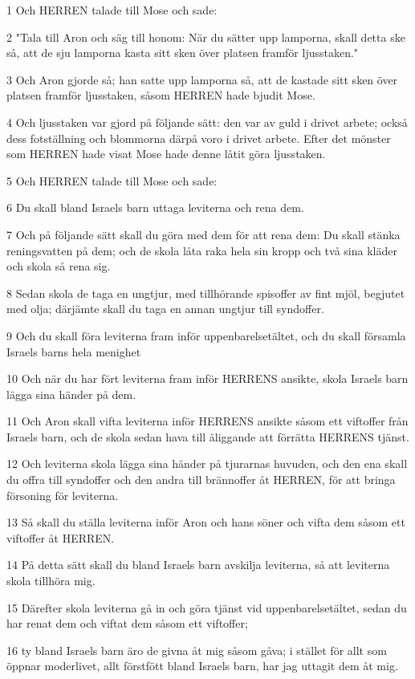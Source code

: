 \par 1 Och HERREN talade till Mose och sade:
\par 2 "Tala till Aron och säg till honom: När du sätter upp lamporna, skall detta ske så, att de sju lamporna kasta sitt sken över platsen framför ljusstaken."
\par 3 Och Aron gjorde så; han satte upp lamporna så, att de kastade sitt sken över platsen framför ljusstaken, såsom HERREN hade bjudit Mose.
\par 4 Och ljusstaken var gjord på följande sätt: den var av guld i drivet arbete; också dess fotställning och blommorna därpå voro i drivet arbete. Efter det mönster som HERREN hade visat Mose hade denne låtit göra ljusstaken.
\par 5 Och HERREN talade till Mose och sade:
\par 6 Du skall bland Israels barn uttaga leviterna och rena dem.
\par 7 Och på följande sätt skall du göra med dem för att rena dem: Du skall stänka reningsvatten på dem; och de skola låta raka hela sin kropp och två sina kläder och skola så rena sig.
\par 8 Sedan skola de taga en ungtjur, med tillhörande spisoffer av fint mjöl, begjutet med olja; därjämte skall du taga en annan ungtjur till syndoffer.
\par 9 Och du skall föra leviterna fram inför uppenbarelsetältet, och du skall församla Israels barns hela menighet
\par 10 Och när du har fört leviterna fram inför HERRENS ansikte, skola Israels barn lägga sina händer på dem.
\par 11 Och Aron skall vifta leviterna inför HERRENS ansikte såsom ett viftoffer från Israels barn, och de skola sedan hava till åliggande att förrätta HERRENS tjänst.
\par 12 Och leviterna skola lägga sina händer på tjurarnas huvuden, och den ena skall du offra till syndoffer och den andra till brännoffer åt HERREN, för att bringa försoning för leviterna.
\par 13 Så skall du ställa leviterna inför Aron och hans söner och vifta dem såsom ett viftoffer åt HERREN.
\par 14 På detta sätt skall du bland Israels barn avskilja leviterna, så att leviterna skola tillhöra mig.
\par 15 Därefter skola leviterna gå in och göra tjänst vid uppenbarelsetältet, sedan du har renat dem och viftat dem såsom ett viftoffer;
\par 16 ty bland Israels barn äro de givna åt mig såsom gåva; i stället för allt som öppnar moderlivet, allt förstfött bland Israels barn, har jag uttagit dem åt mig.
